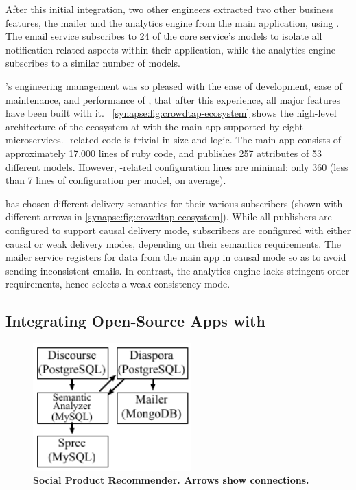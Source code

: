 After this initial integration, two other \crowdtap engineers extracted two other business features, the mailer and the analytics engine from the main application, using \synapse.
The email service subscribes to 24 of the core service's models to isolate all
notification related aspects within their application, while the analytics
engine subscribes to a similar number of models.

\crowdtap's engineering management was so pleased with the ease of development,
ease of maintenance, and performance of \synapse, that after this experience,
all major features have been built with it.
\F~\ref{synapse:fig:crowdtap-ecosystem} shows the high-level architecture of the
\synapse ecosystem at \crowdtap with the main app supported by eight
microservices.
\synapse-related code is trivial in size and logic.
The \crowdtap main app consists of approximately 17,000 lines of ruby code, and publishes 257 attributes of 53 different models.
However, \synapse-related configuration lines are minimal: only 360 (less
than 7 lines of configuration per model, on average).

\crowdtap has chosen different delivery semantics for their various subscribers
(shown with different arrows in \F\ref{synapse:fig:crowdtap-ecosystem}). While all
publishers are configured to support causal delivery mode, subscribers are
configured with either causal or weak delivery modes, depending on their
semantics requirements. The mailer service registers for data from
the main app in causal mode so as to avoid sending inconsistent emails.
In contrast, the analytics engine lacks stringent order
requirements, hence selects a weak consistency mode.

\subsection{Integrating Open-Source Apps with \synapse}
\label{synapse:sec:apps:social}

\begin{figure}[t]
\centering
   \includegraphics[width=2.4in]{figures/synapse/eco-social.pdf}
   \caption{\bf{Social Product Recommender.} Arrows show \synapse connections.}
   \label{synapse:fig:social-ecosystem}
\end{figure}

